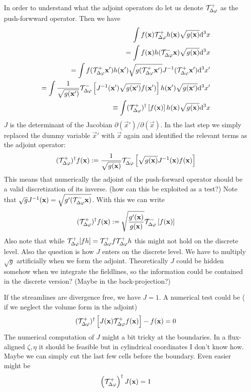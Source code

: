 In order to understand what the adjoint operators do let us denote $\mathcal T^+_{\Delta\varphi}$ as the push-forwward operator. Then we have
\begin{align}
    \int f({\mathbf{x}}) \mathcal T^+_{\Delta\varphi} h({\mathbf{x}}) \sqrt{g({\mathbf{x}})}\mathrm{d}^3x \\
    =  \int f({\mathbf{x}}) h(\mathcal T^-_{\Delta\varphi} {\mathbf{x}})\sqrt{g({\mathbf{x}})}\mathrm{d}^3x \\
    =  \int f(\mathcal T^+_{\Delta\varphi} {\mathbf{x}}') h({\mathbf{x}}')\sqrt{g(\mathcal T^+_{\Delta\varphi} {\mathbf{x}}')}J^{-1}( \mathcal T^+_{\Delta\varphi}{\mathbf{x}}') \mathrm{d}^3x' \\
    =  \int \frac{1}{\sqrt{g({\mathbf{x}}')}}\mathcal T^-_{\Delta\varphi}\left[J^{-1}({\mathbf{x}}')\sqrt{g({\mathbf{x}}')}f({\mathbf{x}}')\right] h({\mathbf{x}}')\sqrt{g({\mathbf{x}}')}   \mathrm{d}^3x' \\
    \equiv  \int (\mathcal T^+_{\Delta\varphi})^\dagger\left[f({\mathbf{x}})\right] h({\mathbf{x}})\sqrt{g({\mathbf{x}})}   \mathrm{d}^3x
    \label{}
\end{align}
$J$ is the determinant of the Jacobian $\partial(\vec x')/\partial(\vec x)$.
In the last step we simply replaced the dummy variable $\vec x'$ with $\vec x$ again and identified the relevant terms
as the adjoint operator:
\begin{align}
    (\mathcal T^+_{\Delta\varphi})^\dagger f({\mathbf{x}} ) := \frac{1}{\sqrt{g({\mathbf{x}})}} \mathcal T^-_{\Delta\varphi}\left[\sqrt{g({\mathbf{x}})} J^{-1}({\mathbf{x}}) f({\mathbf{x}}) \right]
    \label{}
\end{align}
This means that numerically the adjoint of the push-forward 
operator should be a valid discretization of its inverse. (how can this be exploited as a test?)
Note that $\sqrt{g}J^{-1}({\mathbf{x}}) = \sqrt{g'(\mathcal T^-_{\Delta\varphi} {\mathbf{x}})}$.
With this we can write
\begin{align}
    (\mathcal T^+_{\Delta\varphi})^\dagger f({\mathbf{x}} ) := \sqrt{\frac{g'({\mathbf{x}})}{g({\mathbf{x}})}} \mathcal T^-_{\Delta\varphi}\left[f({\mathbf{x}}) \right]
    \label{}
\end{align}
Also note that while $\mathcal T^+_{\Delta\varphi} [fh] = \mathcal T^+_{\Delta\varphi} f \mathcal T^+_{\Delta\varphi} h$ this might not 
hold on the discrete level. Also the question is how $J$ enters 
on the discrete level. We have to multiply $\sqrt{g}$ artificially when we form the adjoint. 
Theoretically $J$ could be hidden somehow when we integrate the fieldlines, so the information could be contained in the discrete version? (Maybe in the back-projection?)

If the streamlines are divergence free, we have $J=1$.
A numerical test could be ( if we neglect the volume form in the adjoint)
\begin{align}
    (\mathcal T^+_{\Delta\varphi})^\dagger \left[J({\mathbf{x}})\mathcal T^+_{\Delta\varphi} f({\mathbf{x}})\right] - f({\mathbf{x}}) = 0
    \label{}
\end{align}
The numerical computation of $J$ might a bit tricky at the boundaries. 
In a flux-aligned $\zeta, \eta$ it should be feasible but in cylindrical coordinates I don't know how. Maybe we can simply cut the last few cells before the boundary.
Even easier might be
\begin{align}
    \left(\mathcal T^+_{\Delta\varphi}\right)^\dagger J({\mathbf{x}} ) = 1
    \label{}
\end{align}


